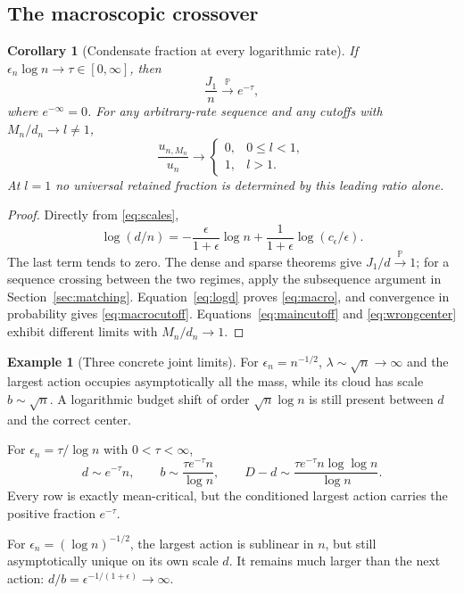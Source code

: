 \documentclass[11pt,a4paper]{article}
\numberwithin{equation}{section}
\newtheorem{corollary}[theorem]{Corollary}
\theoremstyle{definition}
\newtheorem{example}[theorem]{Example}
\theoremstyle{remark}
\newcommand{\Prob}{\mathbb P}
\newcommand{\ee}{\epsilon}
\newcommand{\pto}{\xrightarrow{\Prob}}
\begin{document}
\subsection{The macroscopic crossover}
\begin{corollary}[Condensate fraction at every logarithmic rate]
\label{cor:macro}
If $\ee_n\log n\to\tau\in[0,\infty]$, then
\begin{equation}\label{eq:macro}
 \frac{J_1}{n}\pto e^{-\tau},
\end{equation}
where $e^{-\infty}=0$. For any arbitrary-rate sequence and any cutoffs
with $M_n/d_n\to l\ne1$,
\begin{equation}\label{eq:macrocutoff}
 \frac{u_{n,M_n}}{u_n}\longrightarrow
 \begin{cases}0,&0\le l<1,\\1,&l>1.\end{cases}
\end{equation}
At $l=1$ no universal retained fraction is determined by this leading
ratio alone.
\end{corollary}
\begin{proof}
Directly from \eqref{eq:scales},
\begin{equation}\label{eq:logd}
 \log(d/n)=-\frac{\ee}{1+\ee}\log n
              +\frac1{1+\ee}\log(c_\ee/\ee).
\end{equation}
The last term tends to zero. The dense and sparse theorems give $J_1/d\pto1$;
for a sequence crossing between the two regimes, apply the subsequence
argument in Section~\ref{sec:matching}. Equation~\eqref{eq:logd} proves
\eqref{eq:macro}, and convergence in probability gives
\eqref{eq:macrocutoff}. Equations~\eqref{eq:maincutoff} and
\eqref{eq:wrongcenter} exhibit different limits with $M_n/d_n\to1$.
\end{proof}

\begin{example}[Three concrete joint limits]\label{ex:regimes}
For $\ee_n=n^{-1/2}$, $\lambda\sim\sqrt n\to\infty$ and the largest
action occupies asymptotically all the mass, while its cloud has scale
$b\sim\sqrt n$. A logarithmic budget shift of order $\sqrt n\log n$
is still present between $d$ and the correct center.

For $\ee_n=\tau/\log n$ with $0<\tau<\infty$,
\[
 d\sim e^{-\tau}n,\qquad
 b\sim\frac{\tau e^{-\tau}n}{\log n},\qquad
 D-d\sim\frac{\tau e^{-\tau}n\log\log n}{\log n}.
\]
Every row is exactly mean-critical, but the conditioned largest action
carries the positive fraction $e^{-\tau}$.

For $\ee_n=(\log n)^{-1/2}$, the largest action is sublinear in $n$,
but still asymptotically unique on its own scale $d$. It remains much
larger than the next action: $d/b=\ee^{-1/(1+\ee)}\to\infty$.
\end{example}
\end{document}
